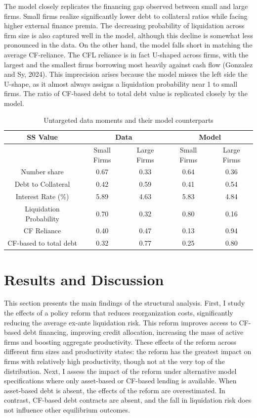 \documentclass[12pt]{article}
\begin{document}
The model closely replicates the financing gap observed between small and large firms. Small firms realize significantly lower debt to collateral ratios while facing higher external finance premia. The decreasing probability of liquidation across firm size is also captured well in the model, although this decline is somewhat less pronounced in the data. On the other hand, the model falls short in matching the average CF-reliance. The CFL reliance is in fact U-shaped across firms, with the largest and the smallest firms borrowing most heavily against cash flow (Gonzalez and Sy, 2024). This imprecision arises because the model misses the left side the U-shape, as it almost always assigns a liquidation probability near 1 to small firms. The ratio of CF-based debt to total debt value is replicated closely by the model. 

\begin{table}[h!]
    \centering
    \begin{tabular}{c|c|c||c|c}
    \textbf{SS Value} &  \multicolumn{2}{c}{\textbf{Data}} & \multicolumn{2}{c}{\textbf{Model}} \\ 
    \toprule
     & Small Firms & Large Firms & Small Firms & Large Firms  \\ 
    \midrule
    Number share & 0.67 & 0.33 & 0.64 & 0.36 \\ 
    Debt to Collateral & 0.42 & 0.59 & 0.41 & 0.54 \\ 
    Interest Rate (\%) & 5.89 & 4.63 & 5.83 & 4.84 \\ 
    Liquidation Probability & 0.70 & 0.32 & 0.80 & 0.16 \\ 
    CF Reliance & 0.40 & 0.47 & 0.13 & 0.94 \\ 
    CF-based to total debt & 0.32 & 0.77 & 0.25 & 0.80 \\ 
    \bottomrule
    \end{tabular}
    \caption{Untargeted data moments and their model counterparts}
    \label{tab:untargeted}
\end{table}


\section{Results and Discussion \label{sec:results}}

This section presents the main findings of the structural analysis. First, I study the effects of a policy reform that reduces reorganization costs, significantly reducing the average ex-ante liquidation risk. This reform improves access to CF-based debt financing, improving credit allocation, increasing the mass of active firms and boosting aggregate productivity. These effects of the reform across different firm sizes and productivity states: the reform has the greatest impact on firms with relatively high productivity, though not at the very top of the distribution. Next, I assess the impact of the reform under alternative model specifications where only asset-based or CF-based lending is available. When asset-based debt is absent, the effects of the reform are overestimated. In contrast, CF-based debt contracts are absent, and the fall in liquidation risk does not influence other equilibrium outcomes.
\end{document}
